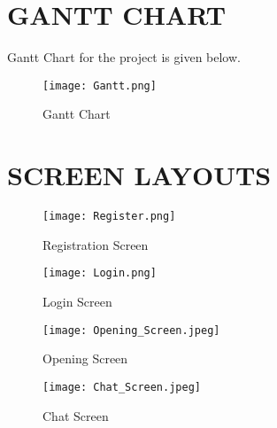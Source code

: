 \chapter{GANTT CHART}

Gantt Chart for the project is given below.
\vspace{1cm}
\begin{figure}[ht]
  \centering
  \texttt{[image: Gantt.png]}
  \caption{Gantt Chart}\label{fig:gantt}
\end{figure}


\chapter{SCREEN LAYOUTS}

\begin{figure}[ht]
  \centering
  \texttt{[image: Register.png]}
  \caption{Registration Screen}\label{fig:register}
\end{figure}

\begin{figure}[ht]
  \centering
  \texttt{[image: Login.png]}
  \caption{Login Screen}\label{fig:login}
\end{figure}


\begin{figure}[ht]
  \centering
  \texttt{[image: Opening\_Screen.jpeg]}
  \caption{Opening Screen}\label{fig:opening_screen}
\end{figure}

\begin{figure}[ht]
  \centering
  \texttt{[image: Chat\_Screen.jpeg]}
  \caption{Chat Screen}\label{fig:chat_screen}
\end{figure}
